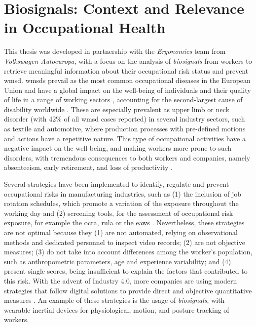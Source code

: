 \section{Biosignals: Context and Relevance in Occupational Health} 
\label{sub:context2}

This thesis was developed in partnership with the \textit{Ergonomics} team from \textit{Volkswagen Autoeuropa}, with a focus on the analysis of \textit{biosignals} from workers to retrieve meaningful information about their occupational risk status and prevent \gls{wmsd}. \gls{wmsd}s prevail as the most common occupational diseases in the European Union and have a global impact on the well-being of individuals and their quality of life in a range of working sectors \cite{Irastorza2010}, accounting for the second-largest cause of disability worldwide \cite{Luttmann2003}. These are especially prevalent as upper limb or neck disorder (with 42\% of all \gls{wmsd} cases reported) \cite{Seidel2019} in several industry sectors, such as textile and automotive, where production processes with pre-defined motions and actions have a repetitive nature. This type of occupational activities have a negative impact on the well being, and making workers more prone to such disorders, with tremendous consequences to both workers and companies, namely absenteeism, early retirement, and loss of productivity \cite{Trabalhadores, Varandas19}. 

Several strategies have been implemented to identify, regulate and prevent occupational risks in manufacturing industries, such as (1) the inclusion of job rotation schedules, which promote a variation of the exposure throughout the working day \cite{jobrotation1, jobrotation2} and (2) screening tools, for the assessment of occupational risk exposure, for example the \gls{ocra}, \gls{rula} or the \gls{eaws} \cite{ocra, rula, eaws}. Nevertheless, these strategies are not optimal because they (1) are not automated, relying on observational methods and dedicated personnel to inspect video records; (2) are not objective measures; (3) do not take into account differences among the worker's population, such as anthropometric parameters, age and experience variability; and (4) present single scores, being insufficient to explain the factors that contributed to this risk. With the advent of Industry 4.0, more companies are using modern strategies that follow digital solutions to provide direct and objective quantitative measures \cite{romero}. An example of these strategies is the usage of \textit{biosignals}, with wearable inertial devices for physiological, motion, and posture tracking of workers.

